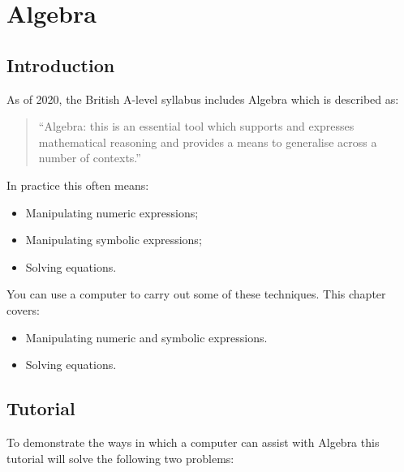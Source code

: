\chapter{Algebra}

\section{Introduction}

As of 2020, the British A-level syllabus includes Algebra which
is described 
as:

\begin{quote}
``Algebra: this is an essential tool which supports and expresses mathematical
reasoning and provides a means to generalise across a number of contexts.''
\end{quote}

In practice this often means:
\begin{itemize}
\item Manipulating numeric expressions;
\item Manipulating symbolic expressions;
\item Solving equations.
\end{itemize}


You can use a computer to carry out some of these techniques.
This chapter covers:

\begin{itemize}
\item Manipulating numeric and symbolic expressions.
\item Solving equations.
\end{itemize}

\section{Tutorial}

To demonstrate the ways in which a computer can assist with Algebra this
tutorial
will solve the following two problems:

